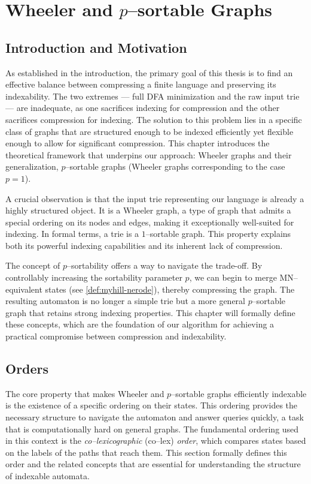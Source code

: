\section{Wheeler and \texorpdfstring{$p$}{p}--sortable Graphs}
\label{sec:wheeler_and_psortable_graphs}

\subsection{Introduction and Motivation}
As established in the introduction, the primary goal of this thesis is to find an effective balance between compressing a finite language and preserving its indexability. The two extremes — full DFA minimization and the raw input trie — are inadequate, as one sacrifices indexing for compression and the other sacrifices compression for indexing. The solution to this problem lies in a specific class of graphs that are structured enough to be indexed efficiently yet flexible enough to allow for significant compression. This chapter introduces the theoretical framework that underpins our approach: Wheeler graphs and their generalization, $p$--sortable graphs (Wheeler graphs corresponding to the case $p=1$).

A crucial observation is that the input trie representing our language is already a highly structured object. It is a Wheeler graph, a type of graph that admits a special ordering on its nodes and edges, making it exceptionally well-suited for indexing. In formal terms, a trie is a $1$--sortable graph. This property explains both its powerful indexing capabilities and its inherent lack of compression.

The concept of $p$--sortability offers a way to navigate the trade-off. By controllably increasing the sortability parameter $p$, we can begin to merge MN--equivalent states (see \cref{def:myhill-nerode}), thereby compressing the graph. The resulting automaton is no longer a simple trie but a more general $p$--sortable graph that retains strong indexing properties. This chapter will formally define these concepts, which are the foundation of our algorithm for achieving a practical compromise between compression and indexability.

\subsection{Orders}
The core property that makes Wheeler and $p$--sortable graphs efficiently indexable is the existence of a specific ordering on their states. This ordering provides the necessary structure to navigate the automaton and answer queries quickly, a task that is computationally hard on general graphs. The fundamental ordering used in this context is the \emph{co--lexicographic} (co--lex) \emph{order}, which compares states based on the labels of the paths that reach them. This section formally defines this order and the related concepts that are essential for understanding the structure of indexable automata.

